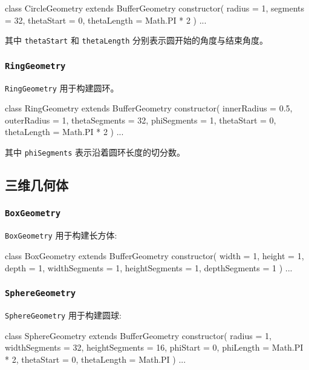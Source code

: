 \begin{JavaScript}
class CircleGeometry extends BufferGeometry {
	constructor( radius = 1, segments = 32, thetaStart = 0, thetaLength = Math.PI * 2 )
  ...
}
\end{JavaScript}

其中 \texttt{thetaStart} 和 \texttt{thetaLength} 分别表示圆开始的角度与结束角度。

\subsubsection*{\texttt{RingGeometry}}

\texttt{RingGeometry} 用于构建圆环。

\begin{JavaScript}
class RingGeometry extends BufferGeometry {
  constructor( innerRadius = 0.5, outerRadius = 1, thetaSegments = 32, phiSegments = 1, thetaStart = 0, thetaLength = Math.PI * 2 )
  ... 
}
\end{JavaScript}

其中 \texttt{phiSegments} 表示沿着圆环长度的切分数。

\subsection{三维几何体}

\subsubsection*{\texttt{BoxGeometry}}

\texttt{BoxGeometry} 用于构建长方体:

\begin{JavaScript}
class BoxGeometry extends BufferGeometry {
  constructor( width = 1, height = 1, depth = 1, widthSegments = 1, heightSegments = 1, depthSegments = 1 )
  ... 
}
\end{JavaScript}

\subsubsection*{\texttt{SphereGeometry}}

\texttt{SphereGeometry} 用于构建圆球:

\begin{JavaScript}
class SphereGeometry extends BufferGeometry {
  constructor( radius = 1, widthSegments = 32, heightSegments = 16, phiStart = 0, phiLength = Math.PI * 2, thetaStart = 0, thetaLength = Math.PI )
  ... 
} 
\end{JavaScript}

